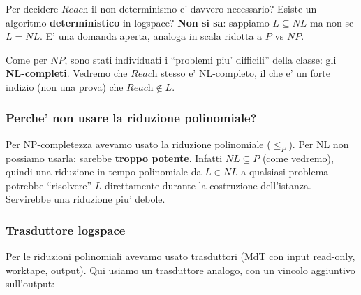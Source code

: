 Per decidere $\textit{Reach}$ il non determinismo e' davvero necessario? Esiste un algoritmo \textbf{deterministico} in logspace? \textbf{Non si sa}: sappiamo $L \subseteq NL$ ma non se $L = NL$. E' una domanda aperta, analoga in scala ridotta a $P$ vs $NP$.

Come per $NP$, sono stati individuati i ``problemi piu' difficili'' della classe: gli \textbf{NL-completi}. Vedremo che $\textit{Reach}$ stesso e' NL-completo, il che e' un forte indizio (non una prova) che $\textit{Reach} \notin L$.

\subsubsection{Perche' non usare la riduzione polinomiale?}

Per NP-completezza avevamo usato la riduzione polinomiale ($\leq_P$). Per NL non possiamo usarla: sarebbe \textbf{troppo potente}. Infatti $NL \subseteq P$ (come vedremo), quindi una riduzione in tempo polinomiale da $L \in NL$ a qualsiasi problema potrebbe ``risolvere'' $L$ direttamente durante la costruzione dell'istanza. Servirebbe una riduzione piu' debole.

\subsubsection{Trasduttore logspace}

Per le riduzioni polinomiali avevamo usato trasduttori (MdT con input read-only, worktape, output). Qui usiamo un trasduttore analogo, con un vincolo aggiuntivo sull'output:



